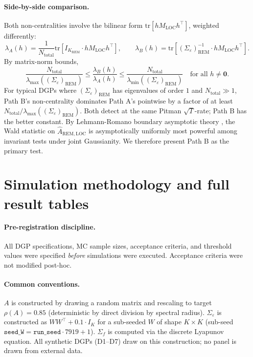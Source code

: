 \documentclass[11pt,letterpaper]{article}
\theoremstyle{remark}
\newcommand{\REM}{\mathrm{REM}}
\newcommand{\LOC}{\mathrm{LOC}}
\newcommand{\Sigmaf}{\Sigma_f}
\newcommand{\Sigmae}{\Sigma_\varepsilon}
\newcommand{\Mloc}{M_{\LOC}}
\newcommand{\Ntot}{N_{\mathrm{total}}}
\newcommand{\Ehat}{\widehat{A}}
\newcommand{\trace}{\mathrm{tr}}
\begin{document}
\paragraph{Side-by-side comparison.} Both non-centralities involve the bilinear form $\trace[h \Mloc h^\top]$, weighted differently:
\begin{equation*}
\lambda_A(h) = \frac{1}{\Ntot} \trace[I_{K_\REM} \cdot h \Mloc h^\top], \qquad \lambda_B(h) = \trace[(\Sigmae)_\REM^{-1} \cdot h \Mloc h^\top].
\end{equation*}
By matrix-norm bounds,
\begin{equation*}
\frac{\Ntot}{\lambda_{\max}((\Sigmae)_\REM)} \le \frac{\lambda_B(h)}{\lambda_A(h)} \le \frac{\Ntot}{\lambda_{\min}((\Sigmae)_\REM)} \quad \text{for all } h \ne \mathbf{0}.
\end{equation*}
For typical DGPs where $(\Sigmae)_\REM$ has eigenvalues of order $1$ and $\Ntot \gg 1$, Path B's non-centrality dominates Path A's pointwise by a factor of at least $\Ntot / \lambda_{\max}((\Sigmae)_\REM)$. Both detect at the same Pitman $\sqrt{T}$-rate; Path B has the better constant. By Lehmann-Romano boundary asymptotic theory \cite{Andrews2001, SelfLiang1987}, the Wald statistic on $\Ehat_{\REM, \LOC}$ is asymptotically uniformly most powerful among invariant tests under joint Gaussianity. We therefore present Path B as the primary test.

\section{Simulation methodology and full result tables}\label{app:H}

\paragraph{Pre-registration discipline.} All DGP specifications, MC sample sizes, acceptance criteria, and threshold values were specified \emph{before} simulations were executed. Acceptance criteria were not modified post-hoc.

\paragraph{Common conventions.} $A$ is constructed by drawing a random matrix and rescaling to target $\rho(A) = 0.85$ (deterministic by direct division by spectral radius). $\Sigmae$ is constructed as $W W^\top + 0.1 \cdot I_K$ for a sub-seeded $W$ of shape $K \times K$ (sub-seed $\mathtt{seed\_W} = \mathtt{run\_seed} \cdot 7919 + 1$). $\Sigmaf$ is computed via the discrete Lyapunov equation. All synthetic DGPs (D1--D7) draw on this construction; no panel is drawn from external data.
\end{document}
